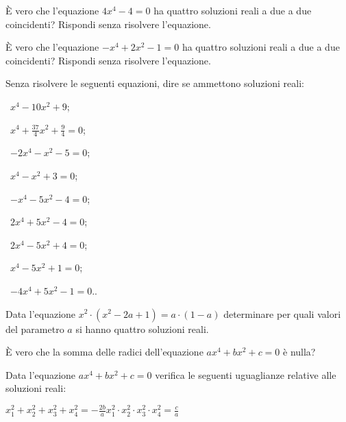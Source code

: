 \begin{esercizio}
\label{ese:5.24}
È vero che l'equazione $4x^4-4=0$ ha quattro soluzioni reali a due a due coincidenti? Rispondi senza risolvere l'equazione.
\end{esercizio}

\begin{esercizio}
 \label{ese:5.25}
È vero che l'equazione $-x^4+2x^2-1=0$ ha quattro soluzioni reali a due a due coincidenti? Rispondi senza risolvere l'equazione.
\end{esercizio}

\begin{esercizio}
 \label{ese:5.26}
Senza risolvere le seguenti equazioni, dire se ammettono soluzioni reali:
\begin{multicols}{3}
 \begin{enumeratea}
 \item~$x^{4}-10x^{2}+9$;
 \item~$x^4+\frac{37} 4x^2+\frac 9 4=0$;
 \item~$-2x^4-x^2-5=0$;
 \item~$x^4-x^2+3=0$;
 \item~$-x^4-5x^2-4=0$;
 \item~$2x^4+5x^2-4=0$;
 \item~$2x^4-5x^2+4=0$;
 \item~$x^4-5x^2+1=0$;
 \item~$-4x^4+5x^2-1=0$..
 \end{enumeratea}
\end{multicols}
\end{esercizio}

\begin{esercizio}[\Ast]
 \label{ese:5.27}
Data l'equazione $x^2\cdot \left(x^2-2a+1\right)=a\cdot (1-a)$ determinare per quali valori del parametro $a$ si hanno quattro soluzioni reali.
\end{esercizio}

\begin{esercizio}
 \label{ese:5.28}
È vero che la somma delle radici dell'equazione $ax^4+bx^2+c=0$ è nulla?
\end{esercizio}

\begin{esercizio}
 \label{ese:5.29}
Data l'equazione $ax^4+bx^2+c=0$ verifica le seguenti uguaglianze relative alle soluzioni reali:

\boxA\quad $x_1^2+x_2^2+x_3^2+x_4^2=-\frac{2b} a$\qquad\qquad \boxB\quad $x_1^2\cdot x_2^2\cdot x_3^2\cdot x_4^2=\frac c a$
\end{esercizio}

